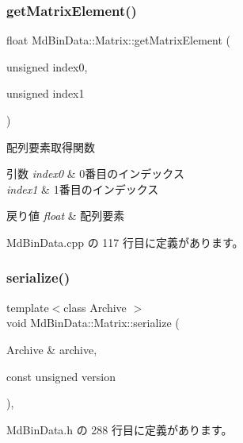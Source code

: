 \subsubsection{\texorpdfstring{get\+Matrix\+Element()}{getMatrixElement()}}
{\footnotesize\ttfamily float Md\+Bin\+Data\+::\+Matrix\+::get\+Matrix\+Element (\begin{DoxyParamCaption}\item[{unsigned}]{index0,  }\item[{unsigned}]{index1 }\end{DoxyParamCaption})}



配列要素取得関数 


\begin{DoxyParams}{引数}
{\em index0} & 0番目のインデックス \\
\hline
{\em index1} & 1番目のインデックス \\
\hline
\end{DoxyParams}

\begin{DoxyRetVals}{戻り値}
{\em float} & 配列要素 \\
\hline
\end{DoxyRetVals}


 Md\+Bin\+Data.\+cpp の 117 行目に定義があります。

\mbox{\label{class_md_bin_data_1_1_matrix_a8494155c326062f5a4c7e2352b7c577d}} 
\subsubsection{\texorpdfstring{serialize()}{serialize()}}
{\footnotesize\ttfamily template$<$class Archive $>$ \\
void Md\+Bin\+Data\+::\+Matrix\+::serialize (\begin{DoxyParamCaption}\item[{Archive \&}]{archive,  }\item[{const unsigned}]{version }\end{DoxyParamCaption})\hspace{0.3cm}{\ttfamily [inline]}, {\ttfamily [private]}}



 Md\+Bin\+Data.\+h の 288 行目に定義があります。

